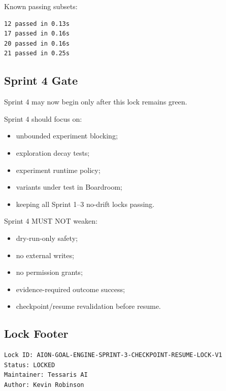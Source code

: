 Known passing subsets:

\begin{verbatim}
12 passed in 0.13s
17 passed in 0.16s
20 passed in 0.16s
21 passed in 0.25s
\end{verbatim}

\subsection{Sprint 4 Gate}

Sprint 4 may now begin only after this lock remains green.

Sprint 4 should focus on:

\begin{itemize}
  \item unbounded experiment blocking;
  \item exploration decay tests;
  \item experiment runtime policy;
  \item variants under test in Boardroom;
  \item keeping all Sprint 1--3 no-drift locks passing.
\end{itemize}

Sprint 4 MUST NOT weaken:

\begin{itemize}
  \item dry-run-only safety;
  \item no external writes;
  \item no permission grants;
  \item evidence-required outcome success;
  \item checkpoint/resume revalidation before resume.
\end{itemize}

\subsection{Lock Footer}

\begin{verbatim}
Lock ID: AION-GOAL-ENGINE-SPRINT-3-CHECKPOINT-RESUME-LOCK-V1
Status: LOCKED
Maintainer: Tessaris AI
Author: Kevin Robinson
\end{verbatim}
